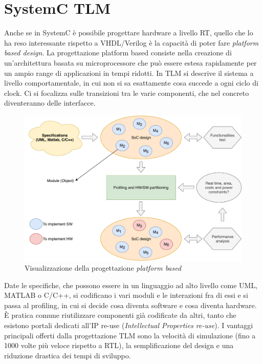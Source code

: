 \documentclass[10pt,a4paper,oneside]{scrbook}
\begin{document}
\section{SystemC TLM}
Anche se in SystemC è possibile progettare hardware a livello RT, quello che lo ha reso interessante 
rispetto a VHDL/Verilog è la capacità di poter fare \textit{platform based design}.
La progettazione platform based consiste nella creazione di un'architettura basata su microprocessore che può essere estesa rapidamente
per un ampio range di applicazioni in tempi ridotti.
In TLM si descrive il sistema a livello comportamentale, in cui non si sa esattamente cosa succede a ogni ciclo
di clock. Ci si focalizza sulle transizioni tra le varie componenti, che nel concreto diventeranno delle interfacce.

\begin{figure}[h]
    \centering
    \includegraphics[width=1\linewidth]{"img/platform based design"}
    \caption{Visualizzazione della progettazione \textit{platform based}}
    \label{fig:platform-based-design}
\end{figure}

Date le specifiche, che possono essere in un linguaggio ad alto livello come UML, MATLAB o C/C++, si codificano i
vari moduli e le interazioni fra di essi e si passa al profiling, in cui si decide cosa diventa software e cosa 
diventa hardware. È pratica comune riutilizzare componenti già codificate da altri, tanto che esistono portali dedicati
all'IP re-use (\textit{Intellectual Properties re-use}).
I vantaggi principali offerti dalla progettazione TLM sono la velocità di simulazione (fino a 1000 volte più veloce 
rispetto a RTL), la semplificazione del design e una riduzione drastica dei tempi di sviluppo.
\end{document}
